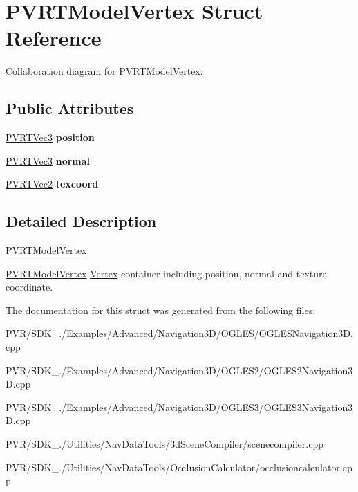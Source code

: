\hypertarget{struct_p_v_r_t_model_vertex}{\section{P\+V\+R\+T\+Model\+Vertex Struct Reference}
\label{struct_p_v_r_t_model_vertex}
}


Collaboration diagram for P\+V\+R\+T\+Model\+Vertex\+:
\subsection*{Public Attributes}
\begin{DoxyCompactItemize}
\item 
\hypertarget{struct_p_v_r_t_model_vertex_a0d497bd31c3cf78acae2f78438a91c07}{\hyperlink{struct_p_v_r_t_vec3}{P\+V\+R\+T\+Vec3} {\bfseries position}}\label{struct_p_v_r_t_model_vertex_a0d497bd31c3cf78acae2f78438a91c07}

\item 
\hypertarget{struct_p_v_r_t_model_vertex_aa3bab453c327b02f68d05cd93ab85164}{\hyperlink{struct_p_v_r_t_vec3}{P\+V\+R\+T\+Vec3} {\bfseries normal}}\label{struct_p_v_r_t_model_vertex_aa3bab453c327b02f68d05cd93ab85164}

\item 
\hypertarget{struct_p_v_r_t_model_vertex_a84964c1f81f6299e543a3fed554741d7}{\hyperlink{struct_p_v_r_t_vec2}{P\+V\+R\+T\+Vec2} {\bfseries texcoord}}\label{struct_p_v_r_t_model_vertex_a84964c1f81f6299e543a3fed554741d7}

\end{DoxyCompactItemize}


\subsection{Detailed Description}


  \hyperlink{struct_p_v_r_t_model_vertex}{P\+V\+R\+T\+Model\+Vertex}



  \hyperlink{struct_p_v_r_t_model_vertex}{P\+V\+R\+T\+Model\+Vertex}  \hyperlink{struct_vertex}{Vertex} container including position, normal and texture coordinate. 

The documentation for this struct was generated from the following files\+:\begin{DoxyCompactItemize}
\item 
P\+V\+R/\+S\+D\+K\+\_./\+Examples/\+Advanced/\+Navigation3\+D/\+O\+G\+L\+E\+S/O\+G\+L\+E\+S\+Navigation3\+D.\+cpp\item 
P\+V\+R/\+S\+D\+K\+\_./\+Examples/\+Advanced/\+Navigation3\+D/\+O\+G\+L\+E\+S2/O\+G\+L\+E\+S2\+Navigation3\+D.\+cpp\item 
P\+V\+R/\+S\+D\+K\+\_./\+Examples/\+Advanced/\+Navigation3\+D/\+O\+G\+L\+E\+S3/O\+G\+L\+E\+S3\+Navigation3\+D.\+cpp\item 
P\+V\+R/\+S\+D\+K\+\_./\+Utilities/\+Nav\+Data\+Tools/3d\+Scene\+Compiler/scenecompiler.\+cpp\item 
P\+V\+R/\+S\+D\+K\+\_./\+Utilities/\+Nav\+Data\+Tools/\+Occlusion\+Calculator/occlusioncalculator.\+cpp\end{DoxyCompactItemize}
